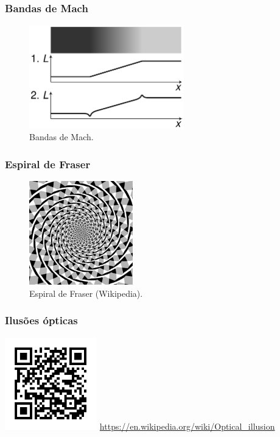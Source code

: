 \begin{frame}[allowframebreaks]
  \frametitle{Bandas de Mach}

   \begin{figure}[h]
   \centering
   \includegraphics[width=0.6\textwidth]{images/mach-bands.pdf}
   \caption{Bandas de Mach.}\label{fig-mach-bands}
   \end{figure}
\end{frame}

\begin{frame}[allowframebreaks]
  \frametitle{Espiral de Fraser}

   \begin{figure}[h]
   \centering
   \includegraphics[width=0.4\textwidth]{images/Fraser_spiral.pdf}
   \caption{Espiral de Fraser (Wikipedia).}\label{fig-fraser}
   \end{figure}
\end{frame}



\begin{frame}[allowframebreaks]
  \frametitle{Ilusões ópticas}
  \centering
  \includegraphics[width=0.3\textwidth]{images/qrcode-wiki-opt-ilu.pdf}
  \url{https://en.wikipedia.org/wiki/Optical_illusion}
\end{frame}

